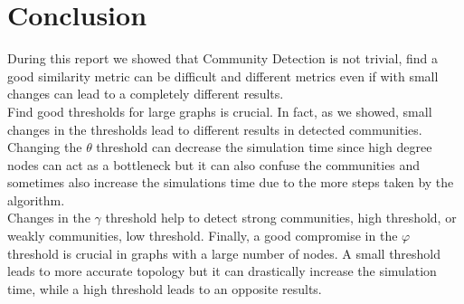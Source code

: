 \documentclass[12pt]{article}
\begin{document}
\section{Conclusion}
During this report we showed that Community Detection is not trivial, find a good similarity metric can be difficult and different metrics even if with small changes can lead to a completely different results.\\
Find good thresholds for large graphs is crucial. In fact, as we showed, small changes in the thresholds lead to different results in detected communities.\\ Changing the $\theta$ threshold can decrease the simulation time since high degree nodes can act as a bottleneck but it can also confuse the communities and sometimes also increase the simulations time due to the more steps taken by the algorithm. \\
Changes in the $\gamma$ threshold help to detect strong communities, high threshold, or weakly communities, low threshold.
Finally, a good compromise in the $\varphi$ threshold is crucial in graphs with a large number of nodes. A small threshold leads to more accurate topology but it can drastically increase the simulation time, while a high threshold leads to an opposite results.



\end{document}
